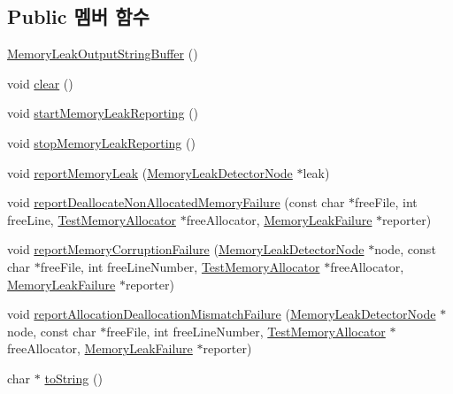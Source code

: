 \subsection*{Public 멤버 함수}
\begin{DoxyCompactItemize}
\item 
\hyperlink{class_memory_leak_output_string_buffer_a0179a0f1ab6daada47cc5396b807e94a}{Memory\+Leak\+Output\+String\+Buffer} ()
\item 
void \hyperlink{class_memory_leak_output_string_buffer_ac8bb3912a3ce86b15842e79d0b421204}{clear} ()
\item 
void \hyperlink{class_memory_leak_output_string_buffer_a99cb7722b04d6e0539701d105c08af23}{start\+Memory\+Leak\+Reporting} ()
\item 
void \hyperlink{class_memory_leak_output_string_buffer_a25142db8cabaf786bf4e41baa0bcc417}{stop\+Memory\+Leak\+Reporting} ()
\item 
void \hyperlink{class_memory_leak_output_string_buffer_a93f881f339b50ea69b8cd7b543e15377}{report\+Memory\+Leak} (\hyperlink{struct_memory_leak_detector_node}{Memory\+Leak\+Detector\+Node} $\ast$leak)
\item 
void \hyperlink{class_memory_leak_output_string_buffer_a0061b779a33beb2d8c87eb915b20309a}{report\+Deallocate\+Non\+Allocated\+Memory\+Failure} (const char $\ast$free\+File, int free\+Line, \hyperlink{class_test_memory_allocator}{Test\+Memory\+Allocator} $\ast$free\+Allocator, \hyperlink{class_memory_leak_failure}{Memory\+Leak\+Failure} $\ast$reporter)
\item 
void \hyperlink{class_memory_leak_output_string_buffer_a14efcbb890531b638e1ff5e6a21e485a}{report\+Memory\+Corruption\+Failure} (\hyperlink{struct_memory_leak_detector_node}{Memory\+Leak\+Detector\+Node} $\ast$node, const char $\ast$free\+File, int free\+Line\+Number, \hyperlink{class_test_memory_allocator}{Test\+Memory\+Allocator} $\ast$free\+Allocator, \hyperlink{class_memory_leak_failure}{Memory\+Leak\+Failure} $\ast$reporter)
\item 
void \hyperlink{class_memory_leak_output_string_buffer_a94baa48406f230991c764abd1cf3a904}{report\+Allocation\+Deallocation\+Mismatch\+Failure} (\hyperlink{struct_memory_leak_detector_node}{Memory\+Leak\+Detector\+Node} $\ast$node, const char $\ast$free\+File, int free\+Line\+Number, \hyperlink{class_test_memory_allocator}{Test\+Memory\+Allocator} $\ast$free\+Allocator, \hyperlink{class_memory_leak_failure}{Memory\+Leak\+Failure} $\ast$reporter)
\item 
char $\ast$ \hyperlink{class_memory_leak_output_string_buffer_ac4969471df03a7a438bd99bfe61a0d5e}{to\+String} ()
\end{DoxyCompactItemize}

